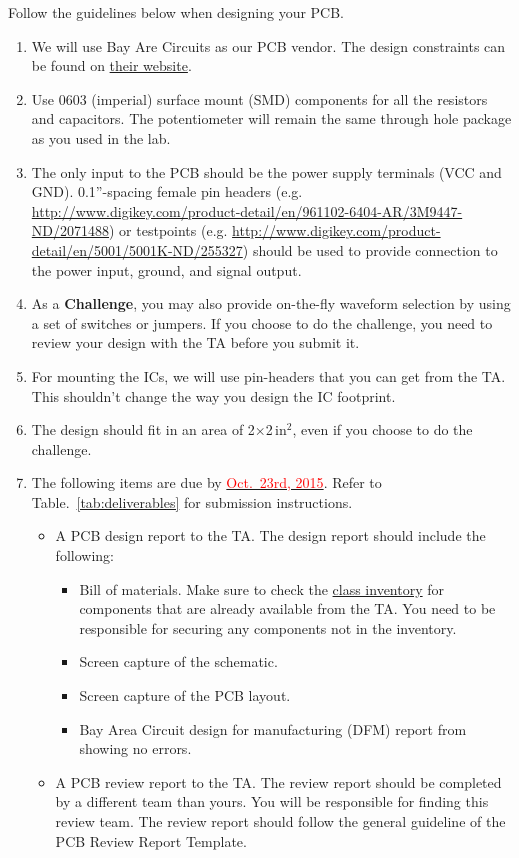\documentclass[letterpaper, 11pt]{article}
\newcommand{\due}[1]{\href{https://github.com/ucdart/UCD-EEC134/blob/master/support/schedule/eec134-schedule.pdf}{\textcolor{red}{#1}}}
\begin{document}
Follow the guidelines below when designing your PCB. 
\begin{enumerate}
	\item We will use Bay Are Circuits as our PCB vendor. The design constraints can be found on \href{http://store.bayareacircuits.com/student-special/}{their website}. 
	
	\item Use 0603 (imperial) surface mount (SMD) components for all the resistors and capacitors. The potentiometer will remain the same through hole package as you used in the lab. 
	
	\item The only input to the PCB should be the power supply terminals (VCC and GND). 0.1''-spacing female pin headers (e.g. \url{http://www.digikey.com/product-detail/en/961102-6404-AR/3M9447-ND/2071488}) or testpoints (e.g. \url{http://www.digikey.com/product-detail/en/5001/5001K-ND/255327}) should be used to provide connection to the power input, ground, and signal output. 
	
	\item As a \textbf{Challenge}, you may also provide on-the-fly waveform selection by using a set of switches or jumpers. If you choose to do the challenge, you need to review your design with the TA before you submit it.
	
	\item For mounting the ICs, we will use pin-headers that you can get from the TA. This shouldn't change the way you design the IC footprint. 
	
	\item The design should fit in an area of 2$\times$2\,in$^2$, even if you choose to do the challenge.
	
	\item The following items are due by \due{Oct.~23rd, 2015}. Refer to Table.~\ref{tab:deliverables} for submission instructions. 
		\begin{itemize}
			\item A PCB design report to the TA. The design report should include the following:
				\begin{itemize}
					\item Bill of materials. Make sure to check the \href{https://docs.google.com/spreadsheets/d/1GJnBLUymuVzXjrK0Zkdbc2lwTbw0z9a0JR4bLLzO-Sw/edit#gid=4}{class inventory} for components that are already available from the TA. You need to be responsible for securing any components not in the inventory. 
					\item Screen capture of the schematic.
					\item Screen capture of the PCB layout.
					\item Bay Area Circuit design for manufacturing (DFM) report from showing no errors.
				\end{itemize}
			\item A PCB review report to the TA. The review report should be completed by a different team than yours. You will be responsible for finding this review team. The review report should follow the general guideline of the PCB Review Report Template.


\end{itemize}
\end{enumerate}
\end{document}
